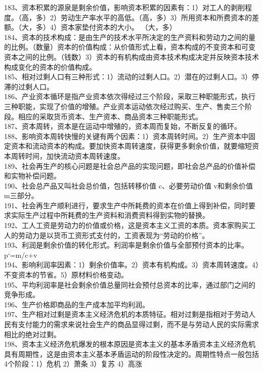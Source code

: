 \documentclass[a4paper,fleqn]{article}
\begin{document}
183、资本积累的源泉是剩余价值，影响资本积累的因素有：1）对工人的剥削程度。（高，多）2）劳动生产率水平的高低。（高，多）3）所用资本和所费资本的差额。（大，多）4）资本家垫付资本的大小。 （大，多） \\
184、资本的技术构成：是由生产的技术水平所决定的生产资料和劳动力之间的量的比例。（数量）资本的价值构成：从价值形式上看，资本构成的不变资本和可变资本之间的比例。（钱数）3）资本的有机构成由资本技术构成决定并反映资本技术构成变化的资本的价值构成。 \\
185、相对过剩人口有三种形式：1）流动的过剩人口。2）潜在的过剩人口。3）停滞的过剩人口。 \\
186、产业资本循环是指产业资本依次得经过三个阶段，采取三种职能形式，执行三种职能，实现了价值的增殖。产业资本运动依次经过购买、生产、售卖三个阶段。相应的采取货币资本、生产资本、商品资本三种职能形式。 \\
187、资本周转，资本是在运动中增殖的，资本周而复始，不断反复的循环。 \\
188、影响资本周转快慢的关键有两个因素：1）资本周转时间。2）生产资本中固定资本和流动资本的构成。要加快资本周转速度，获得更多剩余价值，就要缩短资本周转时间，加快流动资本周转速度。 \\
189、社会再生产的核心问题是社会总产品的实现问题，即社会总产品的价值补偿和实物补偿问题。 \\
190、社会总产品又叫社会总价值，包括转移价值 c、必要劳动价值 v和剩余价值 m三部分。 \\
191、社会再生产顺利进行，要求生产中所耗费的资本在价值上得到补偿，同时要求实际生产过程中所耗费的生产资料和消费资料得到实物的替换。 \\
192、工人工资是劳动力的价值或价格，这是资本主义工资的本质。资本家购买工人的劳动力是以货币工资形式支付的，工资表现为“劳动的价格”。 \\
193、利润是剩余价值的转化形式。利润率是剩余价值与全部预付资本的比率。p‘=m/c+v \\
194、影响利润率因素：1）剩余价值率。2）资本有机构成。3）资本周转速度。4）不变资本的节省。5）原材料价格变动。 \\
195、平均利润率是社会剩余价值总量同社会预付总资本的比率，通过部门之间的竞争形成。 \\
196、生产价格即商品的生产成本加平均利润。 \\
197、生产相对过剩是资本主义经济危机的本质特征。相对过剩是指相对于劳动人民有支付能力的需求来说社会生产的商品显得过剩，而不是与劳动人民的实际需求相比的绝对过剩。 \\
198、资本主义经济危机爆发的根本原因是资本主义的基本矛盾资本主义经济危机具有周期性，这是由资本主义基本矛盾运动的阶段性决定的。周期性特点一般包括 4个阶段：1）危机 2）萧条 3）复苏 4）高涨 \\
\end{document}

